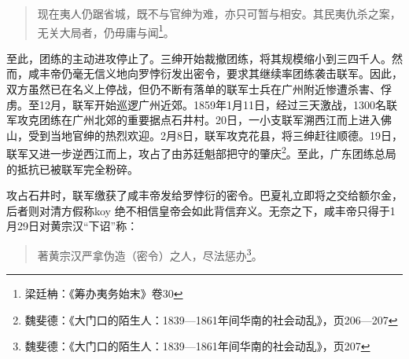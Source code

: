 \begin{quote}
现在夷人仍踞省城，既不与官绅为难，亦只可暂与相安。其民夷仇杀之案，无关大局者，仍毋庸与闻\footnote{梁廷柟：《筹办夷务始末》卷30}。
\end{quote}

至此，团练的主动进攻停止了。三绅开始裁撤团练，将其规模缩小到三四千人。然而，咸丰帝仍毫无信义地向罗悖衍发出密令，要求其继续率团练袭击联军。因此，双方虽然已在名义上停战，但仍不断有落单的联军士兵在广州附近惨遭杀害、俘虏。至12月，联军开始巡逻广州近郊。1859年1月11日，经过三天激战，1300名联军攻克团练在广州北郊的重要据点石井村。20日，一小支联军溯西江而上进入佛山，受到当地官绅的热烈欢迎。2月8日，联军攻克花县，将三绅赶往顺德。19日，联军又进一步逆西江而上，攻占了由苏廷魁部把守的肇庆\footnote{魏斐德：《大门口的陌生人：1839—1861年间华南的社会动乱》，页206—207}。至此，广东团练总局的抵抗已被联军完全粉碎。

攻占石井时，联军缴获了咸丰帝发给罗悖衍的密令。巴夏礼立即将之交给额尔金，后者则对清方假称koy 绝不相信皇帝会如此背信弃义。无奈之下，咸丰帝只得于1月29日对黄宗汉“下诏”称：

\begin{quote}
著黄宗汉严拿伪造（密令）之人，尽法惩办\footnote{魏斐德：《大门口的陌生人：1839—1861年间华南的社会动乱》，页207}。
\end{quote}


